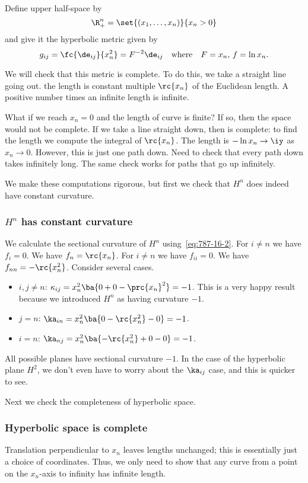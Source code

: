 Define upper half-space by %
\[
\R^n_+=\set{(x_1,\ldots, x_n)}{x_n>0}
\]
and give it the hyperbolic metric given by
\[
g_{ij}=\fc{\de_{ij}}{x_n^2}=F^{-2}\de_{ij}\quad\text{where}\quad F=x_n,\,f=\ln x_n.
\]

We will check that this metric is complete. To do this, we take a straight line going out. %
the length is constant multiple $\rc{x_n}$ of the Euclidean length. A positive number times an infinite length is infinite.

What if we reach $x_n=0$ and the length of curve is finite? If so, then the space would not be complete. If we take a line straight down, then is complete: to find the length we compute the integral of $\rc{x_n}$. The length is $-\ln x_n\to \iy$ as $x_n\to 0$. However, this is just one path down. Need to check that every path down takes infinitely long. The same check works for paths that go up infinitely.

We make these computations rigorous, but first we check that $H^n$ does indeed have constant curvature.

\subsubsection{$H^n$ has constant curvature}
We calculate the sectional curvature of $H^n$ using~\eqref{eq:787-16-2}.
For $i\ne n$ we have $f_i=0$. We have $f_n=\rc{x_n}$. For $i\ne n$ we have $f_{ii}=0$. We have $f_{nn}=-\rc{x_n^2}$. 
Consider several cases. 
\begin{itemize}
\item
$i,j\ne n$: $\kappa_{ij}=x_n^2 \ba{0+0-\prc{x_n}^2}=-1$.
This is a very happy result because we introduced $H^n$ as having curvature $-1$.
\item
$j=n$: $\ka_{in}=x_n^2\ba{0-\rc{x_n^2} -0}=-1$.
\item
$i=n$: $\ka_{nj}=x_n^2\ba{-\rc{x_n^2} +0-0}=-1$.
\end{itemize}
All possible planes have sectional curvature $-1$. In the case of the hyperbolic plane $H^2$, we don't even have to worry about the $\ka_{ij}$ case, and this is quicker to see.

Next we check the completeness of hyperbolic space.
\subsubsection{Hyperbolic space is complete}
Translation perpendicular to $x_n$ leaves lengths unchanged; this is essentially just a choice of coordinates. Thus, we only need to show that any curve from a point on the $x_n$-axis to infinity has infinite length.

